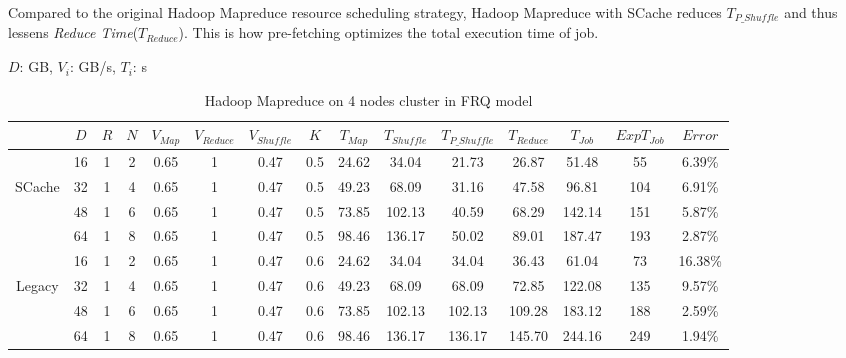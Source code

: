 {%

Compared to the original Hadoop Mapreduce resource scheduling strategy, Hadoop Mapreduce with SCache reduces \(T_{P\_Shuffle}\) and thus lessens \textit{Reduce Time}(\(T_{Reduce}\)). This is how pre-fetching optimizes the total execution time of job.


\begin{table}[!t]
\renewcommand{\arraystretch}{1.3}
\caption{\color{blue}Hadoop Mapreduce on 4 nodes cluster in FRQ model}
\label{table1}
\centering
\(D\): GB, \(V_{i}\): GB/s, \(T_{i}\): s
\begin{tabular}{|c||c|c|c|c|c|c|c||c|c|c|c|c|c|c|}
\hline
 &
\(D\) &	
\(R\) &	
\(N\) &	
\(V_{Map}\) &	
\(V_{Reduce}\) &	
\(V_{Shuffle}\) &	
\(K\) &	
\(T_{Map}\) &	
\(T_{Shuffle}\) &	
\(T_{P\_Shuffle}\) &
\(T_{Reduce}\) & 
\(T_{Job}\) & 
\(Exp T_{Job}\) &
\(Error\)\\

\hline
 & 16	& 1	& 2 &	0.65 &	1 &	0.47 &	0.5 &	24.62 &		34.04	 &	21.73 &	26.87 &	51.48	& 55  &		6.39\% \\
 SCache
 & 32	& 1	& 4 &	0.65 &	1 &	0.47 &	0.5 &	49.23 &		68.09	 &	31.16 &	47.58 &	96.81	& 104 & 	6.91\% \\
 & 48	& 1	& 6 &	0.65 &	1 &	0.47 &	0.5 &	73.85 &		102.13 &	40.59 &	68.29 &	142.14	& 151 & 	5.87\% \\
 & 64	& 1	& 8 &	0.65 &	1 &	0.47 &	0.5 &	98.46 &		136.17 &	50.02 &	89.01 &	187.47	& 193 & 	2.87\% \\
 \hline
 & 16	& 1 & 2 &	0.65 &	1 &	0.47 &	0.6 &	24.62 &		34.04	&	34.04	&	36.43	&	61.04	&	73	&	16.38\%	\\
 Legacy
 & 32	& 1 & 4 &	0.65 &	1 &	0.47 &	0.6 &	49.23 &		68.09	&	68.09	&	72.85	&	122.08	&	135	&	9.57\%	\\
 & 48	& 1 & 6 &	0.65 &	1 &	0.47 &	0.6 &	73.85 &		102.13	&	102.13	&	109.28	&	183.12	&	188	&	2.59\%	\\
 & 64	& 1 & 8 &	0.65 &	1 &	0.47 &	0.6 &	98.46 &		136.17	&	136.17	&	145.70	&	244.16	&	249	&	1.94\%	\\
\hline
\end{tabular}
\end{table}

}
